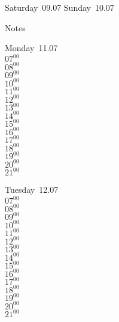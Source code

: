 \documentclass[11pt,a4paper]{book}\usepackage[]{graphicx}\usepackage[]{color}
\begin{document}
\begin{weekendbox}
  Saturday~09.07
  \tcblower
  Sunday~10.07
\end{weekendbox} %
\begin{notebox}
  Notes
\end{notebox}
\clearpage
\begin{headerbox}
\end{headerbox}
\begin{weekdaybox}
  Monday~11.07\\
  { 
  \vfill
  $07^{00}$\\
$08^{00}$\\
$09^{00}$\\
$10^{00}$\\
$11^{00}$\\
$12^{00}$\\
$13^{00}$\\
$14^{00}$\\
$15^{00}$\\
$16^{00}$\\
$17^{00}$\\
$18^{00}$\\
$19^{00}$\\
$20^{00}$\\
$21^{00}$\\
  }
\end{weekdaybox}
\begin{weekdaybox}
  Tuesday~12.07\\
  { 
  \vfill
  $07^{00}$\\
$08^{00}$\\
$09^{00}$\\
$10^{00}$\\
$11^{00}$\\
$12^{00}$\\
$13^{00}$\\
$14^{00}$\\
$15^{00}$\\
$16^{00}$\\
$17^{00}$\\
$18^{00}$\\
$19^{00}$\\
$20^{00}$\\
$21^{00}$\\
  }
\end{weekdaybox}
\end{document}
